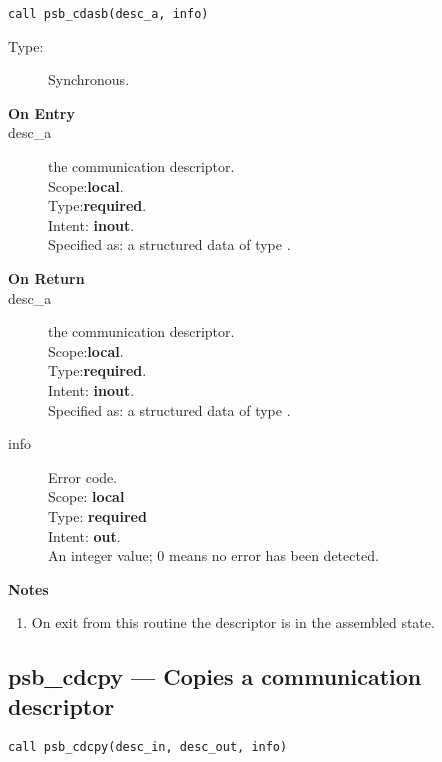 \begin{verbatim}
call psb_cdasb(desc_a, info)
\end{verbatim}

\begin{description}
\item[Type:] Synchronous.
\item[\bf On Entry]
\item[desc\_a] the communication descriptor.\\
Scope:{\bf local}.\\
Type:{\bf required}.\\
Intent: {\bf inout}.\\
Specified as: a structured data of type \descdata.
\end{description}

\begin{description}
\item[\bf On Return]
\item[desc\_a] the communication descriptor.\\
Scope:{\bf local}.\\
Type:{\bf required}.\\
Intent: {\bf inout}.\\
Specified as: a structured data of type \descdata.
\item[info] Error code.\\
Scope: {\bf local} \\
Type: {\bf required} \\
Intent: {\bf out}.\\
An integer value; 0 means no error has been detected. 
\end{description}
{\par\noindent\large\bfseries Notes}
\begin{enumerate}
\item On exit from this routine the descriptor is in the assembled
  state. 
\end{enumerate}



%
%
\clearpage\subsection*{psb\_cdcpy --- Copies a communication descriptor}

\begin{verbatim}
call psb_cdcpy(desc_in, desc_out, info)
\end{verbatim}

